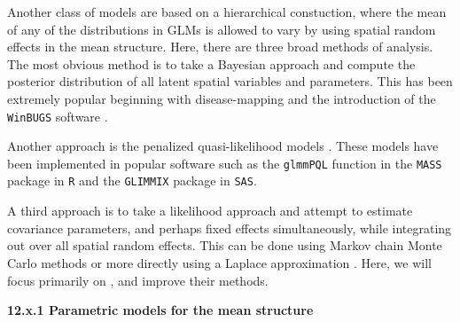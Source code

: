 \documentclass[12pt, titlepage]{article}
\begin{document}
Another class of models are based on a hierarchical constuction, where the mean of any of the distributions in GLMs is allowed to vary by using spatial random effects in the mean structure.  Here, there are three broad methods of analysis.  The most obvious method is to take a Bayesian approach and compute the posterior distribution of all latent spatial variables and parameters.  This has been extremely popular beginning with disease-mapping \citep{clayton_empirical_1987} and the introduction of the \texttt{WinBUGS} software \citep{lunn_winbugs_2000}. 

Another approach is the penalized quasi-likelihood models \citep{breslow_approximate_1993, WolfingerEtAl1993GeneralizedLinearMixed233}.  These models have been implemented in popular software such as the \texttt{glmmPQL} function in the \texttt{MASS} package in \texttt{R} and the \texttt{GLIMMIX} package in \texttt{SAS}.

A third approach is to take a likelihood approach and attempt to estimate covariance parameters, and perhaps fixed effects simultaneously, while integrating out over all spatial random effects.   This can be done using Markov chain Monte Carlo methods \citep[e.g.,][]{christensen_monte_2004} or more directly using a Laplace approximation \citep[e.g.,][]{evangelou_estimation_2011, bonat_practical_2016}.  Here, we will focus primarily on \citet{bonat_practical_2016}, and improve their methods.




{\large \flushleft \textbf{12.x.1 Parametric models for the mean structure}}
\end{document}
